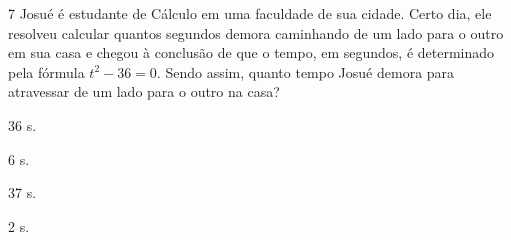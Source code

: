 


















\num{7} Josué é estudante de Cálculo em uma faculdade de sua cidade. Certo
dia, ele resolveu calcular quantos segundos demora caminhando de um lado
para o outro em sua casa e chegou à conclusão de que o tempo, em
segundos, é determinado pela fórmula $t^2 - 36 = 0$. Sendo assim, quanto
tempo Josué demora para atravessar de um lado para o outro na casa?

\begin{escolha}
\item 36 s.
\item 6 s.
\item 37 s.
\item 2 s.
\end{escolha}


